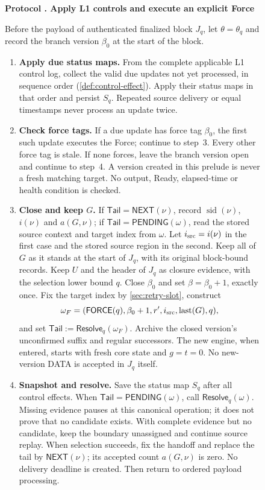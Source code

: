 \documentclass[11pt,a4paper]{article}
\newcommand{\tagg}[1]{\ensuremath{\mathsf{#1}}}
\newcounter{protocol}
\newenvironment{protocol}[3][htbp]{\begin{figure}[#1]\refstepcounter{protocol}\label{#2}
\begin{mdframed}[linewidth=.6pt,skipabove=0pt,skipbelow=0pt,
innertopmargin=7pt,innerbottommargin=7pt]\small
\textbf{Protocol \theprotocol. #3}\par\smallskip}{\end{mdframed}\end{figure}}
\begin{document}
\begin{protocol}{alg:force}{Apply L1 controls and execute an explicit Force}
Before the payload of authenticated finalized block $J_q$, let
$\theta=\theta_q$ and record the branch version $\beta_0$ at the start
of the block.
\begin{enumerate}[label=\textbf{\arabic*)},itemsep=3pt]
\item \textbf{Apply due status maps.}
From the complete applicable L1 control log, collect the valid due
updates not yet processed, in sequence order (\cref{def:control-effect}).
Apply their status maps in that order and persist $S_q$.
Repeated source delivery or equal timestamps never process an update
twice.

\item \textbf{Check force tags.}
If a due update has force tag $\beta_0$, the first such update executes
the Force; continue to step~3. Every other force tag is stale. If none
forces, leave the branch version
open and continue to step~4. A version created in this
prelude is never a fresh matching target. No output, Ready, elapsed-time
or health condition is checked.

\item \textbf{Close and keep $G$.}
If $\mathsf{Tail}=\tagg{NEXT}(\nu)$, record
$\operatorname{sid}(\nu)$, $i(\nu)$ and $a(G,\nu)$; if
$\mathsf{Tail}=\tagg{PENDING}(\omega)$, read the stored source context
and target index from $\omega$.  Let $i_{\rm src}=i(\nu)$ in the first
case and the stored source region in the second.
Keep all of $G$ as it stands at the start of $J_q$, with its original
block-bound records. Keep $U$ and the header of $J_q$ as closure evidence, with
the selection lower bound $q$. Close $\beta_0$ and set
$\beta=\beta_0+1$, exactly once. Fix the target index by
\cref{sec:retry-slot}, construct
\[
 \omega_F=(\tagg{FORCE}(q),\beta_0+1,r',i_{\rm src},
           \operatorname{last}(G),q),
\]
and set $\mathsf{Tail}:=\tagg{Resolve}_q(\omega_F)$. Archive the closed version's unconfirmed suffix
and regular successors. The new engine, when entered, starts with fresh
core state and $g=t=0$. No new-version DATA is accepted in $J_q$ itself.

\item \textbf{Snapshot and resolve.}
Save the status map $S_q$ after all control effects.
When $\mathsf{Tail}=\tagg{PENDING}(\omega)$, call
$\tagg{Resolve}_q(\omega)$. Missing evidence
pauses at this canonical operation; it does not prove that no candidate
exists. With complete evidence but no candidate, keep the boundary
unassigned and continue source replay. When selection succeeds, fix the
handoff and replace the tail by $\tagg{NEXT}(\nu)$; its accepted count
$a(G,\nu)$ is zero. No delivery
deadline is created. Then return to ordered payload processing.
\end{enumerate}
\end{protocol}
\end{document}

